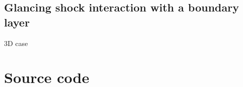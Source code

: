 \documentclass[12pt,a4paper,twoside]{article}
\newcommand{\code}[2]{
 \hrulefill
 \scriptsize
 
 \hrulefill
 \vspace{2em}
 \normalsize
}
\begin{document}
\subsection{Glancing shock interaction with a boundary layer}
%
3D case


\clearpage



\clearpage
\appendix
\section{Source code}

\noindent
\code{}{../../../app/eilmer3/source/e3march.py}

\clearpage
{} %
\printindex
\end{document}
